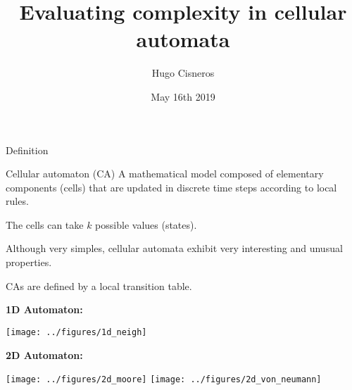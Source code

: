\documentclass[xcolor=dvipsnames]{beamer}
\title{Evaluating complexity  in cellular automata}
\author{Hugo Cisneros}
\date{May 16th 2019}
\begin{document}
\maketitle

\begin{frame}{Definition}
  \begin{block}{Cellular automaton (CA)}
    A mathematical model composed of \alert{elementary components} (cells) that
    are updated in discrete time steps according to \alert{local rules}.


    The cells can take $k$ possible values (states).
  \end{block}

  Although very simples, cellular automata exhibit very interesting and unusual
  properties.

  CAs are defined by a local transition table.

  \vfill
  \begin{minipage}[h]{.3\linewidth}
    \textbf{1D Automaton:}
    \vfill

    \texttt{[image: ../figures/1d\_neigh]}
  \end{minipage}
  \hfill
  \begin{minipage}[h]{.6\linewidth}
    \textbf{2D Automaton:}
    \vfill

    \texttt{[image: ../figures/2d\_moore]}
    \hfill
    \texttt{[image: ../figures/2d\_von\_neumann]}
  \end{minipage}


\end{frame}
\end{document}
